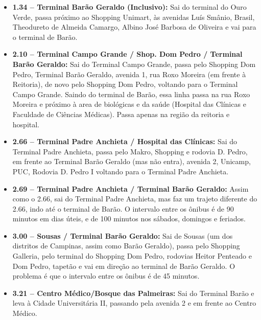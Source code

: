 \begin{itemize}

\item  \textbf{1.34 -- Terminal Barão Geraldo (Inclusivo):} Sai do terminal do
       Ouro Verde, passa próximo ao Shopping Unimart, às avenidas Luís Smânio,
       Brasil, Theodureto de Almeida Camargo, Albino José Barbosa de Oliveira e vai
       para o terminal de Barão.

\item  \textbf{2.10 -- Terminal Campo Grande / Shop. Dom Pedro / Terminal Barão
       Geraldo:} Sai do Terminal Campo Grande, passa pelo Shopping Dom Pedro,
       Terminal Barão Geraldo, avenida 1, rua Roxo Moreira (em frente à Reitoria),
       de novo pelo Shopping Dom Pedro, voltando para o Terminal Campo Grande.
       Saindo do terminal de Barão, essa linha passa na rua Roxo Moreira e próximo
       à area de biológicas e da saúde (Hospital das Clínicas e Faculdade de
       Ciências Médicas). Passa apenas na região da reitoria e hospital.

\item  \textbf{2.66 -- Terminal Padre Anchieta / Hospital das Clínicas:} Sai do
       Terminal Padre Anchieta, passa pelo Makro, Shopping e rodovia D. Pedro, em
       frente ao Terminal Barão Geraldo (mas não entra), avenida 2, Unicamp, PUC,
       Rodovia D. Pedro I voltando para o Terminal Padre Anchieta.

\item  \textbf{2.69 -- Terminal Padre Anchieta / Terminal Barão Geraldo:} Assim
       como o 2.66, sai do Terminal Padre Anchieta, mas faz um trajeto diferente do
       2.66, indo até o terminal de Barão. O intervalo entre os ônibus é de 90
       minutos em dias úteis, e de 100 minutos nos sábados, domingos e feriados.

\item  \textbf{3.00 -- Sousas / Terminal Barão Geraldo:} Sai de Sousas (um dos
       distritos de Campinas, assim como Barão Geraldo), passa pelo Shopping
       Galleria, pelo terminal do Shopping Dom Pedro, rodovias Heitor Penteado
       e Dom Pedro, tapetão e vai em direção ao terminal de Barão Geraldo.
       O problema é que o intervalo entre os ônibus é de 45 minutos.

\item  \textbf{3.21 -- Centro Médico/Bosque das Palmeiras:} Sai do Terminal
       Barão e leva à Cidade Universitária II, passando pela avenida 2 e em frente
       ao Centro Médico.


\end{itemize}
